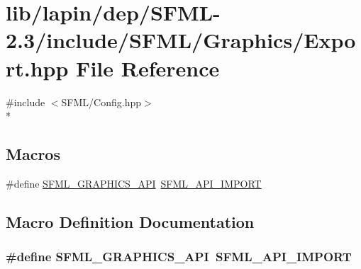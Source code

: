 \hypertarget{lapin_2dep_2_s_f_m_l-2_83_2include_2_s_f_m_l_2_graphics_2_export_8hpp}{\section{lib/lapin/dep/\-S\-F\-M\-L-\/2.3/include/\-S\-F\-M\-L/\-Graphics/\-Export.hpp File Reference}
\label{lapin_2dep_2_s_f_m_l-2_83_2include_2_s_f_m_l_2_graphics_2_export_8hpp}
}
{\ttfamily \#include $<$S\-F\-M\-L/\-Config.\-hpp$>$}\\*
\subsection*{Macros}
\begin{DoxyCompactItemize}
\item 
\#define \hyperlink{lapin_2dep_2_s_f_m_l-2_83_2include_2_s_f_m_l_2_graphics_2_export_8hpp_ab84c9f1035e146917de3bc0f98d72b35}{S\-F\-M\-L\-\_\-\-G\-R\-A\-P\-H\-I\-C\-S\-\_\-\-A\-P\-I}~\hyperlink{sfml_2dep_2_s_f_m_l-2_84_82_2include_2_s_f_m_l_2_config_8hpp_aba0bbe5791bee6633caa835c7f6a12a4}{S\-F\-M\-L\-\_\-\-A\-P\-I\-\_\-\-I\-M\-P\-O\-R\-T}
\end{DoxyCompactItemize}


\subsection{Macro Definition Documentation}
\hypertarget{lapin_2dep_2_s_f_m_l-2_83_2include_2_s_f_m_l_2_graphics_2_export_8hpp_ab84c9f1035e146917de3bc0f98d72b35}{
\subsubsection[{S\-F\-M\-L\-\_\-\-G\-R\-A\-P\-H\-I\-C\-S\-\_\-\-A\-P\-I}]{\setlength{\rightskip}{0pt plus 5cm}\#define S\-F\-M\-L\-\_\-\-G\-R\-A\-P\-H\-I\-C\-S\-\_\-\-A\-P\-I~{\bf S\-F\-M\-L\-\_\-\-A\-P\-I\-\_\-\-I\-M\-P\-O\-R\-T}}}\label{lapin_2dep_2_s_f_m_l-2_83_2include_2_s_f_m_l_2_graphics_2_export_8hpp_ab84c9f1035e146917de3bc0f98d72b35}
